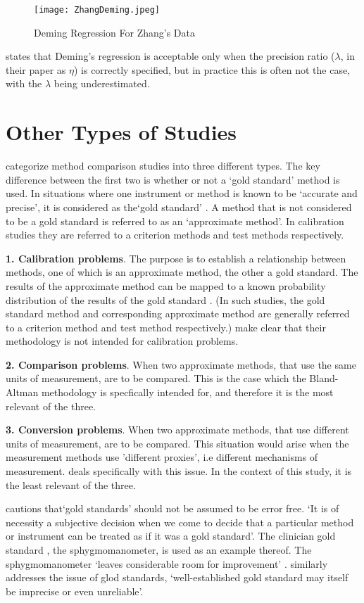 \documentclass[12pt, a4paper]{report}
\theoremstyle{plain}
\theoremstyle{definition}
\theoremstyle{remark}
\begin{document}
\begin{figure}[h!]
  \texttt{[image: ZhangDeming.jpeg]}
  \caption{Deming Regression For Zhang's Data}\label{ZhangDeming}
\end{figure}


\citet{CarollRupert} states that Deming's
regression is acceptable only when the precision ratio ($\lambda$,
in their paper as $\eta$) is correctly specified, but in practice
this is often not the case, with the $\lambda$ being
underestimated.
\newpage
\section{Other Types of Studies}
\citet{lewis} categorize method comparison studies into three
different types.  The key difference between the first two is
whether or not a `gold standard' method is used. In situations
where one instrument or method is known to be `accurate and
precise', it is considered as the`gold standard' \citep{lewis}. A
method that is not considered to be a gold standard is referred to
as an `approximate method'. In calibration studies they are
referred to a criterion methods and test methods respectively.


\textbf{1. Calibration problems}. The purpose is to establish a
relationship between methods, one of which is an approximate
method, the other a gold standard. The results of the approximate
method can be mapped to a known probability distribution of the
results of the gold standard \citep{lewis}. (In such studies, the
gold standard method and corresponding approximate method are
generally referred to a criterion method and test method
respectively.) \citet*{BA83} make clear that their methodology is
not intended for calibration problems.

\bigskip \textbf{2. Comparison problems}. When two approximate
methods, that use the same units of measurement, are to be
compared. This is the case which the Bland-Altman methodology is
specfically intended for, and therefore it is the most relevant of
the three.

\bigskip \textbf{3. Conversion problems}. When two approximate
methods, that use different units of measurement, are to be
compared. This situation would arise when the measurement methods
use 'different proxies', i.e different mechanisms of measurement.
\citet{lewis} deals specifically with this issue. In the context
of this study, it is the least relevant of the three.

\citet[p.47]{DunnSEME} cautions that`gold standards' should not be
assumed to be error free. `It is of necessity a subjective
decision when we come to decide that a particular method or
instrument can be treated as if it was a gold standard'. The
clinician gold standard , the sphygmomanometer, is used as an
example thereof.  The sphygmomanometer `leaves considerable room
for improvement' \citep{DunnSEME}. \citet{pizzi} similarly
addresses the issue of glod standards, `well-established gold
standard may itself be imprecise or even unreliable'.
\end{document}
